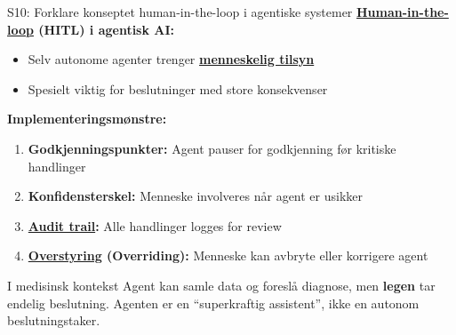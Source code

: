 \documentclass[aspectratio=169, 10pt]{beamer}
\begin{document}
\begin{frame}{S10: Forklare konseptet human-in-the-loop i agentiske systemer}
    \textbf{\href{https://en.wikipedia.org/wiki/Human-in-the-loop}{Human-in-the-loop} (HITL) i agentisk AI:}
    
    \vspace{0.3cm}
    \begin{itemize}
        \item Selv autonome agenter trenger \textbf{\href{https://en.wikipedia.org/wiki/Human_oversight_of_AI}{menneskelig tilsyn}}
        \item Spesielt viktig for beslutninger med store konsekvenser
    \end{itemize}
    
    \vspace{0.3cm}
    \textbf{Implementeringsmønstre:}
    \begin{enumerate}
        \item \textbf{Godkjenningspunkter:} Agent pauser for godkjenning før kritiske handlinger
        \item \textbf{Konfidensterskel:} Menneske involveres når agent er usikker
        \item \textbf{\href{https://en.wikipedia.org/wiki/Audit_trail}{Audit trail}:} Alle handlinger logges for review
        \item \textbf{\href{https://en.wikipedia.org/wiki/Override}{Overstyring} (Overriding):} Menneske kan avbryte eller korrigere agent
    \end{enumerate}
    
    \vspace{0.3cm}
    \begin{alertblock}{I medisinsk kontekst}
        Agent kan samle data og foreslå diagnose, men \textbf{legen} tar endelig beslutning. Agenten er en ``superkraftig assistent'', ikke en autonom beslutningstaker.
    \end{alertblock}
\end{frame}
\end{document}
